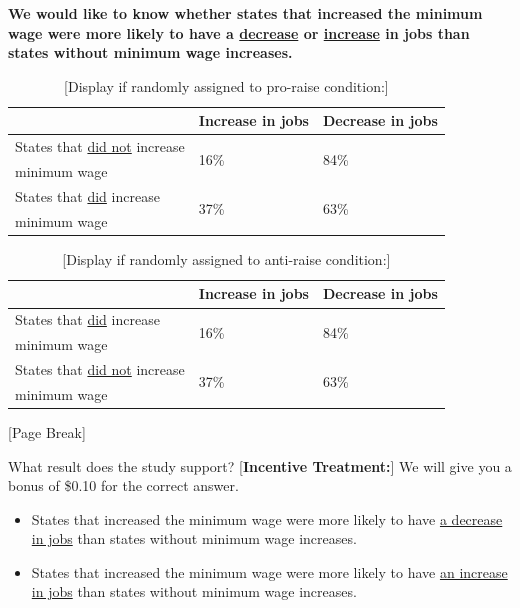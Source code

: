 \documentclass[12pt, letterpaper]{article}
\begin{document}
\medskip
\textbf{We would like to know whether states that increased the minimum wage were more likely to have a \underline{decrease} or \underline{increase} in jobs than states without minimum wage increases.}

\begin{table}[h]
\centering
\caption*{{[}Display if randomly assigned to pro-raise condition:{]}} \label{tab:siprowage}
\begin{tabular}{|l|l|l|}
\hline 
  & Increase in jobs  & Decrease in jobs \\\hline
  States that \underline{did not} increase     & \multirow{2}{*}{16\%} & \multirow{2}{*}{84\%} \\ 
  minimum wage           &               & \\ \hline
  States that \underline{did} increase & \multirow{2}{*}{37\%} & \multirow{2}{*}{63\%} \\ 
  minimum wage           &               &  \\\hline
\end{tabular}
\end{table}

\vspace{-5mm}
\begin{table}[h]
\centering
\caption*{{[}Display if randomly assigned to anti-raise condition:{]}} \label{tab:siantiwage}
\begin{tabular}{|l|l|l|}
\hline 
  & Increase in jobs  & Decrease in jobs \\\hline
  States that \underline{did} increase     & \multirow{2}{*}{16\%} & \multirow{2}{*}{84\%} \\ 
  minimum wage           &               & \\ \hline
  States that \underline{did not} increase & \multirow{2}{*}{37\%} & \multirow{2}{*}{63\%} \\ 
  minimum wage           &               &  \\\hline
\end{tabular}
\end{table}

\vspace{-2.5mm}
\begin{center}
 {[}Page Break{]}
\end{center}

What result does the study support? {[}\textbf{Incentive Treatment:}{]} We will give you a bonus of \$0.10 for the correct answer.
\begin{itemize}
  \item States that increased the minimum wage were more likely to have \uline{a decrease in jobs} than states without minimum wage increases.
  \item States that increased the minimum wage were more likely to have \uline{an increase in jobs} than states without minimum wage increases.
\end{itemize}
\end{document}
